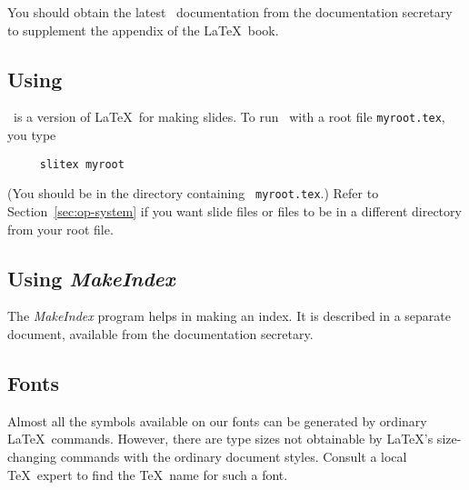 
You should obtain the latest \BibTeX\ documentation from the
documentation secretary to supplement the appendix of the
\LaTeX\ book.

\subsection{Using \SliTeX}

\SliTeX\ is a version of \LaTeX\ for making slides.
To run \SliTeX\  with a root file \mbox{\tt myroot.tex}, you type
\begin{verbatim}
     slitex myroot
\end{verbatim}
(You should be in the directory containing \mbox{\tt
myroot.tex}.) Refer to Section~\ref{sec:op-system} if you want slide
files or \hbox{\verb||} files to be in a different directory from
your root file.


\subsection{Using {\em MakeIndex\/}} \label{sec:makeindex}

The {\em MakeIndex\/} program helps in making an index.  It is
described in a separate document, available from the documentation secretary.


\subsection{Fonts}

Almost all the symbols available on our fonts can be generated by
ordinary \LaTeX\ commands.  However, there are type sizes not
obtainable by \LaTeX's size-changing commands with the ordinary
document styles.  Consult a local \TeX\ expert to find the
\TeX\ name for such a font.

